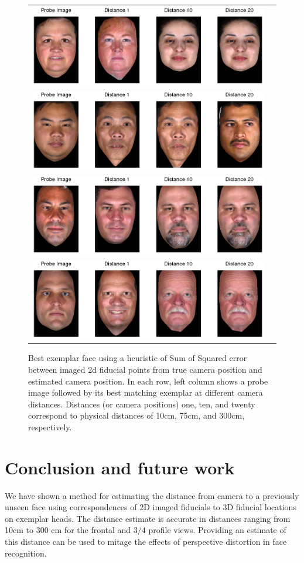 \documentclass[runningheads]{llncs}
\begin{document}
\begin{figure}[h]
\centering
\begin{tabular}{cc}
\includegraphics[width=.7\linewidth]{resources/figures/best_exemplar1.png} \\
\includegraphics[width=.7\linewidth]{resources/figures/best_exemplar3.png} \\
\includegraphics[width=.7\linewidth]{resources/figures/best_exemplar10.png} \\
\includegraphics[width=.7\linewidth]{resources/figures/best_exemplar26.png}
\end{tabular}
\caption{Best exemplar face using a heuristic of Sum of Squared error between imaged 2d fiducial points from true camera position and estimated camera position.  In each row, left column shows a probe image followed by its best matching exemplar at different camera distances. Distances (or camera positions) one, ten, and twenty correspond to physical distances of 10cm, 75cm, and 300cm, respectively. }
\label{fig:bestexemplar}
\end{figure}

\section{Conclusion and future work}
We have shown a method for estimating the distance from camera to a previously unseen face using correspondences of 2D imaged fiducials to 3D fiducial locations on exemplar heads.  
The distance estimate is accurate in distances ranging from 10cm to 300 cm for the frontal and $3/4$ profile views.  
Providing an estimate of this distance can be used to mitage the effects of perspective distortion in face recognition.  
\end{document}
